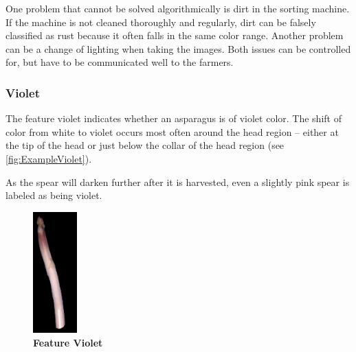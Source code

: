\bigskip
One problem that cannot be solved algorithmically is dirt in the sorting machine. If the machine is not cleaned thoroughly and regularly, dirt can be falsely classified as rust because it often falls in the same color range. Another problem can be a change of lighting when taking the images. Both issues can be controlled for, but have to be communicated well to the farmers.


\subsubsection{Violet}
\label{subsec:Violet}

The feature violet indicates whether an asparagus is of violet color.
The shift of color from white to violet occurs most often around the head region -- either at the tip of the head or just below the collar of the head region (see \autoref{fig:ExampleViolet}).

As the spear will darken further after it is harvested, even a slightly pink spear is labeled as being violet.

\begin{figure}
  \begin{center}
    \includegraphics[width=0.15\textwidth]{Figures/chapter03/example_img_violet.png}
  \end{center}
  \vspace{-15pt}
  \caption[Example Image Feature Violet]{ \textbf{Feature Violet}}
  \label{fig:ExampleViolet}
\end{figure}

